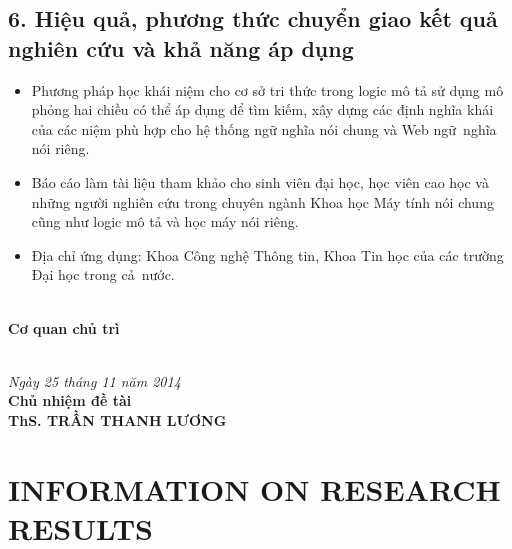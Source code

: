 \section*{6. Hiệu quả, phương thức chuyển giao kết quả nghiên cứu và khả năng áp dụng}
\begin{itemize}
	\item Phương pháp học khái niệm cho cơ sở tri thức trong logic mô tả sử dụng mô phỏng hai chiều có thể áp dụng để tìm kiếm, xây dựng các định nghĩa khái của các niệm phù hợp cho hệ thống ngữ nghĩa nói chung và Web ngữ~nghĩa nói riêng.

	\item Báo cáo làm tài liệu tham khảo cho sinh viên đại học, học viên cao học và những người nghiên cứu trong chuyên ngành Khoa học Máy tính nói chung cũng như logic mô tả và học máy nói riêng.

	\item Địa chỉ ứng dụng: Khoa Công nghệ Thông tin, Khoa Tin học của các trường Đại học trong cả~nước.
\end{itemize}
\begin{minipage}{0.48\textwidth}
	\begin{flushleft}
		{~\;}\\[2.0ex]
		{\bf Cơ quan chủ trì} \\[2.2cm]
		{~\;}
	\end{flushleft}
\end{minipage}
\begin{minipage}{0.50\textwidth}
	\begin{center}
		\textit{Ngày 25 tháng 11 năm 2014}\\
		{\bf Chủ nhiệm đề tài} \\[2.2cm]
		{\bf ThS. TRẦN THANH LƯƠNG}
	\end{center}
\end{minipage}		

\cleardoublepage
\newpage
\chapter*{INFORMATION ON RESEARCH RESULTS}
\thispagestyle{fancy}

